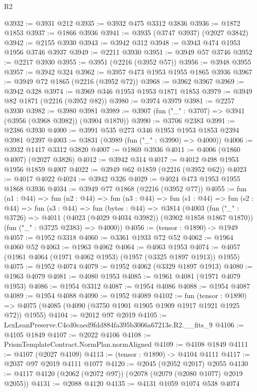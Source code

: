 \begin{lexlean}{R2}
\begin{coremodule}
@3932 := @3931 @212
@3935 := @3932 @475 @3312 @3836
@3936 := @1872 @1853
@3937 := @1866 @3936
@3941 := @3935 (@3747 @3937) (@2027 @3842)
@3942 := @2155 @3930
@3943 := @3942 @312
@3948 := @3943 @474 @1953 @1956 @3746 @3937
@3949 := @2211 @3930
@3951 := @3949 @57 @3746
@3952 := @2217 @3930
@3955 := @3951 (@2216 (@3952 @57))
@3956 := @3948 @3955
@3957 := @3942 @324
@3962 := @3957 @473 @1953 @1955 @1865 @3936
@3967 := @3949 @72 @1865 (@2216 (@3952 @72))
@3968 := @3962 @3967
@3969 := @3942 @328
@3974 := @3969 @346 @1953 @1953 @1871 @1853
@3979 := @3949 @82 @1871 (@2216 (@3952 @82))
@3980 := @3974 @3979
@3981 := @2257 @3930
@3982 := @3980 @3981
@3989 := @3907 (fun ("_" : @3707) => @3941 (@3956 (@3968 @3982)) (@3904 @1870))
@3990 := @3706 @2383
@3991 := @2386 @3930
@4000 := @3991 @535 @273 @346 @1953 @1953 @1853 @2394 @3981 @2397
@4003 := @3831 (@3989 (fun ("_" : @3990) => @4000))
@4006 := @3932 @1417 @3312 @3820
@4007 := @1869 @3936
@4011 := @4006 (@1860 @4007) (@2027 @3826)
@4012 := @3942 @314
@4017 := @4012 @498 @1953 @1956 @1859 @4007
@4022 := @3949 @62 @1859 (@2216 (@3952 @62))
@4023 := @4017 @4022
@4024 := @3942 @326
@4029 := @4024 @473 @1953 @1955 @1868 @3936
@4034 := @3949 @77 @1868 (@2216 (@3952 @77))
@4055 := fun (n1 : @44) =>
  fun (n2 : @44) =>
  fun (n3 : @44) =>
  fun (s1 : @44) =>
  fun (s2 : @44) =>
  fun (s3 : @44) =>
  fun (bytes : @44) =>
  @3814
    (@4003
      (fun ("_" : @3726) => @4011 (@4023 (@4029 @4034 @3982)) (@3902 @1858 @1867 @1870))
      (fun ("_" : @3725 @2383) => @4000))
@4056 := (tensor : @1890) -> @1949
@4057 := @1952 @3318
@4060 := @3361 @1933 @72 @52
@4062 := @1964 @4060 @52
@4063 := @1963 @4062
@4064 := @4063 @1953
@4074 := @4057 (@1961 @4064 (@1971 @4062 @1953) (@1957 (@3325 @1897 @1913)) @1955)
@4075 := @1952 @4074
@4079 := @1952 @4062 (@3329 @1897 @1913)
@4080 := @1963 @4079
@4081 := @4080 @1953
@4085 := @1961 @4081 (@1971 @4079 @1953)
@4086 := @1954 @3312
@4087 := @1954 @4086
@4088 := @1954 @4087
@4089 := @1954 @4088
@4090 := @1952 @4089
@4102 := fun (tensor : @1890) =>
  @4075 (@4085 (@4090 (@3750 @1901 @1905 @1909 @1917 @1921 @1925 @72)) @1955)
@4104 := @2012 @97 @2019
@4105 := LexLeanPreserve.C4cd0caed9fdd884fa395b3066a67213e.R2.__fits_9
@4106 := @4105 @1849
@4107 := @2022 @4106
@4108 := PrismTemplateContract.NormPlan.normAligned
@4109 := @4108 @1849
@4111 := @4107 (@2027 @4109)
@4113 := (tensor : @1890) -> @4104 @4111
@4117 := @2037 @97 @2019 @4111 @1077
@4120 := @2045 (@2052 @2017) @2055
@4130 := @4117 @4120 (@2062 (@2072 @97)) (@2078 (@2079 (@2080 @1077) @2019 @2055))
@4131 := @2088 @4120
@4135 := @4131 @1059 @1074 @538 @4074

\end{coremodule}
\end{lexlean}
